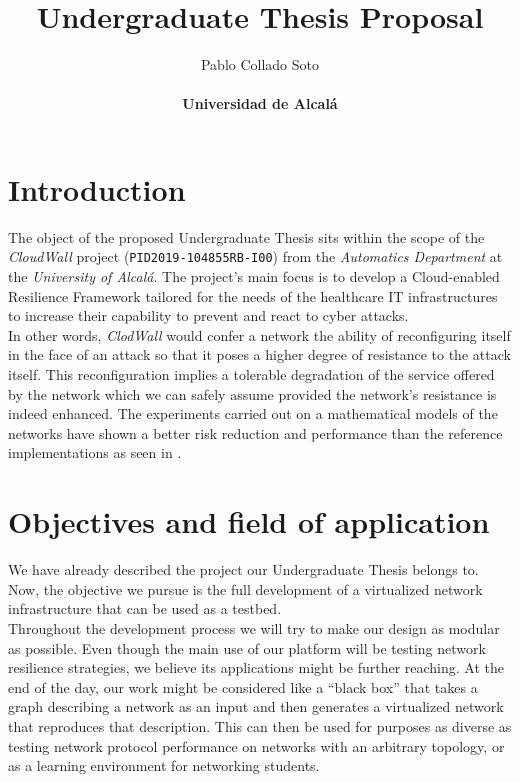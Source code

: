 \documentclass[12pt]{article}
\title{\vspace{-1cm}Undergraduate Thesis Proposal}
\author{Pablo Collado Soto \\ \\ \textbf{Universidad de Alcalá}}
\date{}
\begin{document}
    \maketitle

    \section{Introduction}
        The object of the proposed Undergraduate Thesis sits within the scope of the \textit{CloudWall} project (\texttt{PID2019-104855RB-I00}) from the \textit{Automatics Department} at the \textit{University of Alcalá}. The project's main focus is to develop a Cloud-enabled Resilience Framework
        tailored for the needs of the healthcare IT infrastructures to increase their capability to prevent and react to cyber attacks.\\

        In other words, \textit{ClodWall} would confer a network the ability of reconfiguring itself in the face of an attack so that it poses a higher degree of resistance to the attack itself. This reconfiguration implies a tolerable degradation of the service offered by the network which we can safely assume provided the network's resistance is indeed enhanced. The experiments carried out on a mathematical models of the networks have shown a better risk reduction and performance than the reference implementations as seen in \cite{bib:REACT}.\\

    \section{Objectives and field of application}
        We have already described the project our Undergraduate Thesis belongs to. Now, the objective we pursue is the full development of a virtualized network infrastructure that can be used as a testbed.\\

        Throughout the development process we will try to make our design as modular as possible. Even though the main use of our platform will be testing network resilience strategies, we believe its applications might be further reaching. At the end of the day, our work might be considered like a ``black box'' that takes a graph describing a network as an input and then generates a virtualized network that reproduces that description. This can then be used for purposes as diverse as testing network protocol performance on networks with an arbitrary topology, or as a learning environment for networking students.\\
\end{document}
